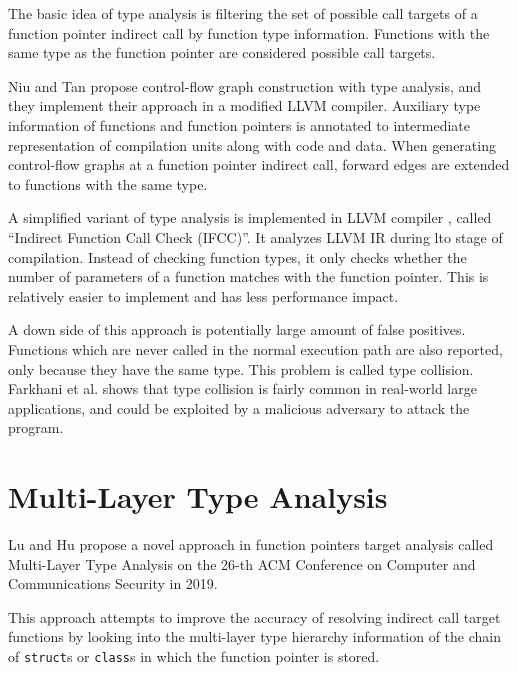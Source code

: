 The basic idea of type analysis is filtering the set of possible call targets of a function pointer indirect call by function type information. Functions with the same type as the function pointer are considered possible call targets.

Niu and Tan \cite{modular-cfi} propose control-flow graph construction with type analysis, and they implement their approach in a modified LLVM compiler. Auxiliary type information of functions and function pointers is annotated to intermediate representation of compilation units along with code and data. When generating control-flow graphs at a function pointer indirect call, forward edges are extended to functions with the same type.

A simplified variant of type analysis is implemented in LLVM compiler \cite{ifcc}, called ``Indirect Function Call Check (IFCC)''. It analyzes LLVM IR during \ac{lto} stage of compilation. Instead of checking function types, it only checks whether the number of parameters of a function matches with the function pointer. This is relatively easier to implement and has less performance impact.

A down side of this approach is potentially large amount of false positives. Functions which are never called in the normal execution path are also reported, only because they have the same type. This problem is called type collision.  Farkhani et al. \cite{effectiveness-type-cfi} shows that type collision is fairly common in real-world large applications, and could be exploited by a malicious adversary to attack the program.

\section{Multi-Layer Type Analysis}
\label{section:mlta}

Lu and Hu \cite{mlta} propose a novel approach in function pointers target analysis called Multi-Layer Type Analysis on the 26-th ACM Conference on Computer and Communications Security in 2019.

This approach attempts to improve the accuracy of resolving indirect call target functions by looking into the multi-layer type hierarchy information of the chain of \texttt{struct}s or \texttt{class}s in which the function pointer is stored.

